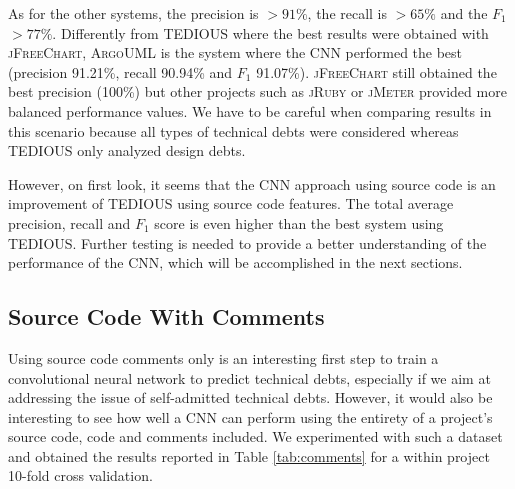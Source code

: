 As for the other systems, the precision is $> 91\%$, the recall is $> 65\%$ and the $F_1$ $> 77\%$. Differently from TEDIOUS where the best results were obtained with \textsc{jFreeChart}, \textsc{ArgoUML} is the system where the CNN performed the best (precision 91.21\%, recall 90.94\% and $F_1$ 91.07\%). \textsc{jFreeChart} still obtained the best precision (100\%) but other projects such as \textsc{jRuby} or \textsc{jMeter} provided more balanced performance values. We have to be careful when comparing results in this scenario because all types of technical debts were considered whereas TEDIOUS only analyzed design debts. 

However, on first look, it seems that the CNN approach using source code is an improvement of TEDIOUS using source code features. The total average precision, recall and $F_1$ score is even higher than the best system using TEDIOUS. Further testing is needed to provide a better understanding of the performance of the CNN, which will be accomplished in the next sections.


\subsection{Source Code With Comments}


Using source code comments only is an interesting first step to train a convolutional neural network to predict technical debts, especially if we aim at addressing the issue of self-admitted technical debts. However, it would also be interesting to see how well a CNN can perform using the entirety of a project's source code, code and comments included. We experimented with such a dataset and obtained the results reported in Table \ref{tab:comments} for a within project 10-fold cross validation.


